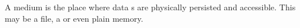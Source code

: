 \section{\TERMmedium{}}
\label{sec:Medium}

A medium is the place where data \TERMdataBlock{}s are physically persisted and accessible. This may be a file, a \TERMmediaStream{} or even plain memory.

%
%
